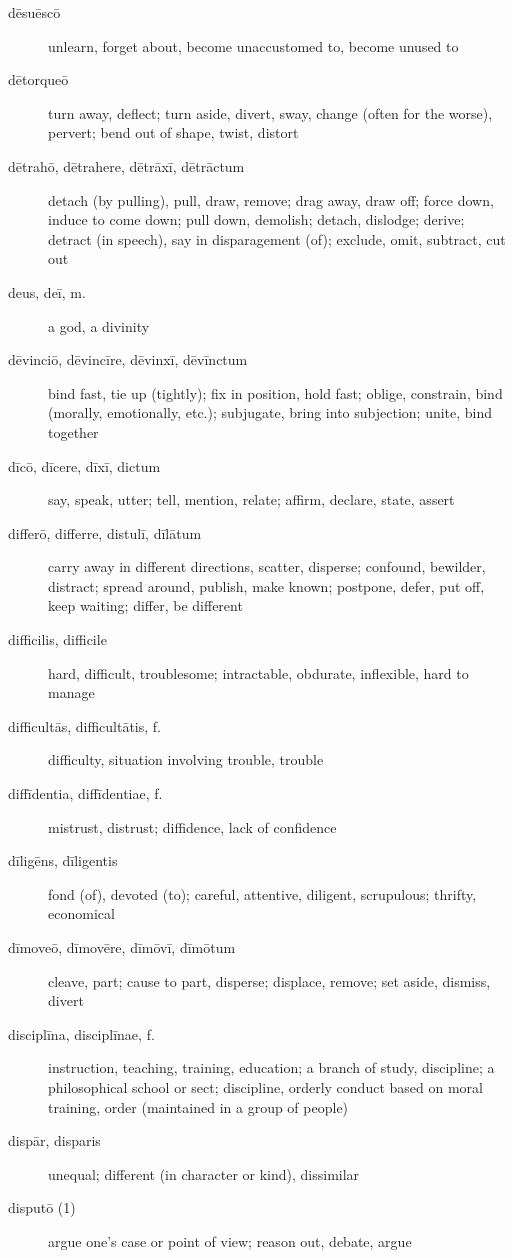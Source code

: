 \begin{description}
    \item[dēsuēscō] unlearn, forget about, become unaccustomed to, become unused to
    \item[dētorqueō] turn away, deflect; turn aside, divert, sway, change (often for the worse), pervert; bend out of shape, twist, distort
    \item[dētrahō, dētrahere, dētrāxī, dētrāctum] detach (by pulling), pull, draw, remove; drag away, draw off; force down, induce to come down; pull down, demolish; detach, dislodge; derive; detract (in speech), say in disparagement (of); exclude, omit, subtract, cut out
    \item[deus, deī, m.] \marginnote{*}a god, a divinity
    \item[dēvinciō, dēvincīre, dēvinxī, dēvīnctum] bind fast, tie up (tightly); fix in position, hold fast; oblige, constrain, bind (morally, emotionally, etc.); subjugate, bring into subjection; unite, bind together
    \item[dīcō, dīcere, dīxī, dictum] \marginnote{*}say, speak, utter; tell, mention, relate; affirm, declare, state, assert
    \item[differō, differre, distulī, dīlātum] \marginnote{*}carry away in different directions, scatter, disperse; confound, bewilder, distract; spread around, publish, make known; postpone, defer, put off, keep waiting; differ, be different
    \item[difficilis, difficile] \marginnote{*}hard, difficult, troublesome; intractable, obdurate, inflexible, hard to manage
    \item[difficultās, difficultātis, f.] difficulty, situation involving trouble, trouble
    \item[diffīdentia, diffīdentiae, f.] mistrust, distrust; diffidence, lack of confidence
    \item[dīligēns, dīligentis] fond (of), devoted (to); careful, attentive, diligent, scrupulous; thrifty, economical
    \item[dīmoveō, dīmovēre, dīmōvī, dīmōtum] cleave, part; cause to part, disperse; displace, remove; set aside, dismiss, divert
    \item[disciplīna, disciplīnae, f.] instruction, teaching, training, education; a branch of study, discipline; a philosophical school or sect; discipline, orderly conduct based on moral training, order (maintained in a group of people)
    \item[dispār, disparis] unequal; different (in character or kind), dissimilar
    \item[disputō (1)] argue one's case or point of view; reason out, debate, argue

\end{description}
